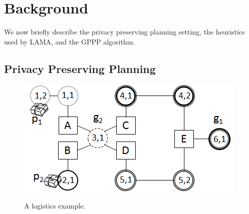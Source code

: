 \documentclass[letterpaper]{article}
\theoremstyle{definition}
\begin{document}



\section{Background}

We now briefly describe the privacy preserving planning setting, the heuristics used by LAMA, and the GPPP algorithm.


\subsection{Privacy Preserving Planning}

\begin{figure}
\centering
\includegraphics[scale=0.5]{Logistics}
\label{fig:logistics}
\caption{A logistics example.}
\end{figure}
\end{document}
